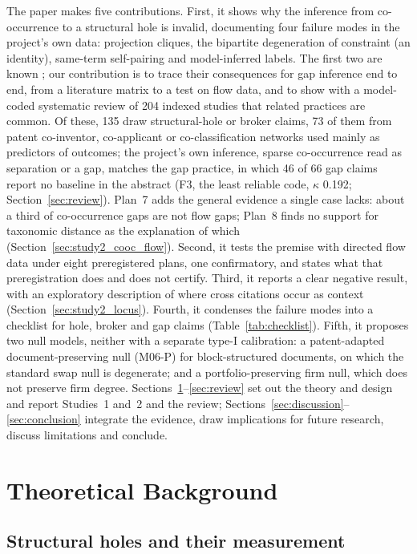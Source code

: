 The paper makes five contributions. First, it shows why the inference from co-occurrence to a structural hole is invalid, documenting four failure modes in the project's own data: projection cliques, the bipartite degeneration of constraint (an identity), same-term self-pairing and model-inferred labels. The first two are known \citep{opsahl2013triadic,jasny2015two,everett2020unpacking}; our contribution is to trace their consequences for gap inference end to end, from a literature matrix to a test on flow data, and to show with a model-coded systematic review of 204 indexed studies that related practices are common. Of these, 135 draw structural-hole or broker claims, 73 of them from patent co-inventor, co-applicant or co-classification networks used mainly as predictors of outcomes; the project's own inference, sparse co-occurrence read as separation or a gap, matches the gap practice, in which 46 of 66 gap claims report no baseline in the abstract (F3, the least reliable code, $\kappa$ 0.192; Section~\ref{sec:review}). Plan~7 adds the general evidence a single case lacks: about a third of co-occurrence gaps are not flow gaps; Plan~8 finds no support for taxonomic distance as the explanation of which (Section~\ref{sec:study2_cooc_flow}). Second, it tests the premise with directed flow data under eight preregistered plans, one confirmatory, and states what that preregistration does and does not certify. Third, it reports a clear negative result, with an exploratory description of where cross citations occur as context (Section~\ref{sec:study2_locus}). Fourth, it condenses the failure modes into a checklist for hole, broker and gap claims (Table~\ref{tab:checklist}). Fifth, it proposes two null models, neither with a separate type-I calibration: a patent-adapted document-preserving null (M06-P) for block-structured documents, on which the standard swap null is degenerate; and a portfolio-preserving firm null, which does not preserve firm degree.
Sections~\ref{sec:theory}--\ref{sec:review} set out the theory and design and report Studies~1 and~2 and the review; Sections~\ref{sec:discussion}--\ref{sec:conclusion} integrate the evidence, draw implications for future research, discuss limitations and conclude.

\section{Theoretical Background}
\label{sec:theory}

\subsection{Structural holes and their measurement}
\label{sec:theory_holes}

